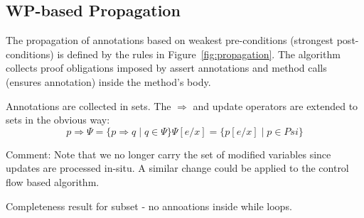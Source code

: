 \documentclass[10pt,notitlepage,twoside]{article}
\begin{document}
\subsection{WP-based Propagation}\label{sec:wp}

The propagation of annotations based on weakest pre-conditions (strongest post-conditions) is defined  by the rules in Figure~\ref{fig:propagation}. The algorithm collects proof obligations imposed by assert annotations and method calls (ensures annotation) inside the method's body.

Annotations are collected in sets. The $\Rightarrow$ and update operators are extended to sets in the obvious way:
\begin{displaymath}
p \Rightarrow \Psi = \{ p \Rightarrow q \mid q \in \Psi \}
\Psi[e/x] = \{ p[e/x] \mid p \in Psi \}
\end{displaymath}

Comment: Note that we no longer carry the set of modified variables since updates are processed in-situ. A similar change could be applied to the control flow based algorithm.

Completeness result for subset - no annoations inside while loops.
\end{document}

